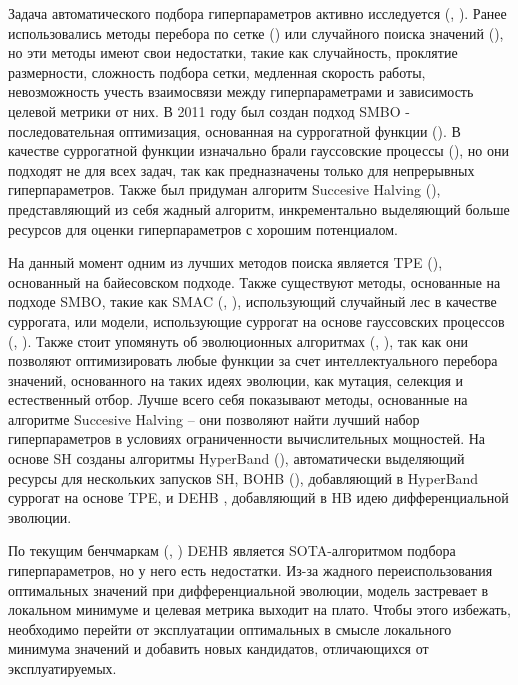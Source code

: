\documentclass{article}
\begin{document}
Задача автоматического подбора гиперпараметров активно исследуется (\cite{Liu_2023}, \cite{morales2023survey}). Ранее использовались методы перебора по сетке (\cite{grid_search}) или случайного поиска значений (\cite{random_search}), но эти методы имеют свои недостатки, такие как случайность, проклятие размерности, сложность подбора сетки, медленная скорость работы, невозможность учесть взаимосвязи между гиперпараметрами и зависимость целевой метрики от них. В 2011 году был создан подход SMBO - последовательная оптимизация, основанная на суррогатной функции (\cite{10.1007/978-3-642-25566-3_40}). В качестве суррогатной функции изначально брали гауссовские процессы (\cite{wistuba2018scalable}), но они подходят не для всех задач, так как предназначены только для непрерывных гиперпараметров. Также был придуман алгоритм Succesive Halving (\cite{jamieson2015nonstochastic}), представляющий из себя жадный алгоритм, инкрементально выделяющий больше ресурсов для оценки гиперпараметров с хорошим потенциалом.

На данный момент одним из лучших методов поиска является TPE (\cite{NIPS2011_86e8f7ab}), основанный на байесовском подходе. Также существуют методы, основанные на подходе SMBO, такие как SMAC (\cite{10.1007/978-3-642-25566-3_40}, \cite{lindauer2022smac3}), использующий случайный лес в качестве суррогата, или модели, использующие суррогат на основе гауссовских процессов (\cite{schilling2016scalable}, \cite{wistuba2018scalable}). Также стоит упомянуть об эволюционных алгоритмах (\cite{young2015optimizing}, \cite{alibrahim2021hyperparameter}), так как они позволяют оптимизировать любые функции за счет интеллектуального перебора значений, основанного на таких идеях эволюции, как мутация, селекция и естественный отбор. Лучше всего себя показывают методы, основанные на алгоритме Succesive Halving -- они позволяют найти лучший набор гиперпараметров в условиях ограниченности вычислительных мощностей. На основе SH созданы алгоритмы HyperBand (\cite{li2018hyperband}), автоматически выделяющий ресурсы для нескольких запусков SH, BOHB (\cite{falkner2018bohb}), добавляющий в HyperBand суррогат на основе TPE, и DEHB \cite{awad2021dehb}, добавляющий в HB идею дифференциальной эволюции. 

По текущим бенчмаркам (\cite{vanschoren2014openml}, \cite{zela2020bench}) DEHB является SOTA-алгоритмом подбора гиперпараметров, но у него есть недостатки. Из-за жадного переиспользования оптимальных значений при дифференциальной эволюции, модель застревает в локальном минимуме и целевая метрика выходит на плато. Чтобы этого избежать, необходимо перейти от эксплуатации оптимальных в смысле локального минимума значений и добавить новых кандидатов, отличающихся от эксплуатируемых. 
\end{document}
